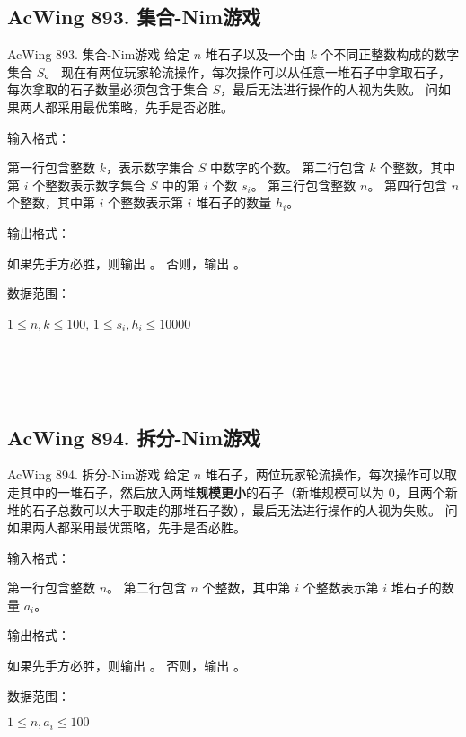 \subsection{AcWing 893. 集合-Nim游戏}
\begin{titledbox}{AcWing 893. 集合-Nim游戏}
    给定 $n$ 堆石子以及一个由 $k$ 个不同正整数构成的数字集合 $S$。 现在有两位玩家轮流操作，每次操作可以从任意一堆石子中拿取石子，每次拿取的石子数量必须包含于集合 $S$，最后无法进行操作的人视为失败。 问如果两人都采用最优策略，先手是否必胜。

    输入格式：

    第一行包含整数 $k$，表示数字集合 $S$ 中数字的个数。 第二行包含 $k$ 个整数，其中第 $i$ 个整数表示数字集合 $S$ 中的第 $i$ 个数 $s_i$。 第三行包含整数 $n$。 第四行包含 $n$ 个整数，其中第 $i$ 个整数表示第 $i$ 堆石子的数量 $h_i$。

    输出格式：

    如果先手方必胜，则输出 。 否则，输出 。

    数据范围：

    $1 \le n, k \le 100$, $1 \le s_i,h_i \le 10000$

    \begin{inputblock}
         \\
         \\
         \\
    \end{inputblock}
    \begin{outputblock}
    \end{outputblock}
\end{titledbox}

\subsection{AcWing 894. 拆分-Nim游戏}
\begin{titledbox}{AcWing 894. 拆分-Nim游戏}
    给定 $n$ 堆石子，两位玩家轮流操作，每次操作可以取走其中的一堆石子，然后放入两堆\textbf{规模更小}的石子（新堆规模可以为 $0$，且两个新堆的石子总数可以大于取走的那堆石子数），最后无法进行操作的人视为失败。 问如果两人都采用最优策略，先手是否必胜。

    输入格式：

    第一行包含整数 $n$。 第二行包含 $n$ 个整数，其中第 $i$ 个整数表示第 $i$ 堆石子的数量 $a_i$。

    输出格式：

    如果先手方必胜，则输出 。 否则，输出 。

    数据范围：

    $1 \le n, a_i \le 100$

    \begin{inputblock}
         \\
    \end{inputblock}
    \begin{outputblock}
    \end{outputblock}
\end{titledbox}

